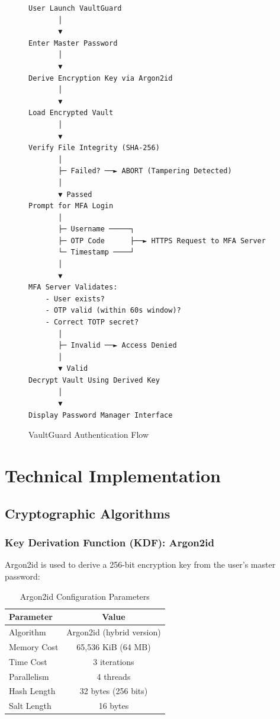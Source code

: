 \documentclass[12pt,a4paper]{report}
\begin{document}
\begin{figure}[H]
\centering
\begin{verbatim}
User Launch VaultGuard
       │
       ▼
Enter Master Password
       │
       ▼
Derive Encryption Key via Argon2id
       │
       ▼
Load Encrypted Vault
       │
       ▼
Verify File Integrity (SHA-256)
       │
       ├─ Failed? ──► ABORT (Tampering Detected)
       │
       ▼ Passed
Prompt for MFA Login
       │
       ├─ Username ─────┐
       ├─ OTP Code      ├──► HTTPS Request to MFA Server
       └─ Timestamp ────┘
       │
       ▼
MFA Server Validates:
    - User exists?
    - OTP valid (within 60s window)?
    - Correct TOTP secret?
       │
       ├─ Invalid ──► Access Denied
       │
       ▼ Valid
Decrypt Vault Using Derived Key
       │
       ▼
Display Password Manager Interface
\end{verbatim}
\caption{VaultGuard Authentication Flow}
\end{figure}

\chapter{Technical Implementation}

\section{Cryptographic Algorithms}

\subsection{Key Derivation Function (KDF): Argon2id}

Argon2id is used to derive a 256-bit encryption key from the user's master password:

\begin{table}[H]
\centering
\begin{tabular}{|l|c|}
\hline
\textbf{Parameter} & \textbf{Value} \\
\hline
Algorithm & Argon2id (hybrid version) \\
Memory Cost & 65,536 KiB (64 MB) \\
Time Cost & 3 iterations \\
Parallelism & 4 threads \\
Hash Length & 32 bytes (256 bits) \\
Salt Length & 16 bytes \\
\hline
\end{tabular}
\caption{Argon2id Configuration Parameters}
\end{table}
\end{document}

